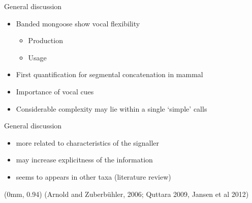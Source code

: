 \documentclass[xcolor=dvipsnames]{beamer}
\newcommand\References[1]{
\tiny{
  \begin{textblock*}{\paperwidth}(0mm, 0.94\paperheight)%
    \raggedleft (#1)\hspace{0.01\paperwidth}
  \end{textblock*}}}
\begin{document}
\begin{frame}{General discussion}
\begin{itemize}
\item<1-> Banded mongoose show vocal flexibility
\begin{itemize}
\item<1> Production 
\item<1> Usage
\end{itemize}  
\item<2-> First quantification for segmental concatenation in mammal 
\item<3-> Importance of vocal cues
\item<4-> Considerable complexity  may lie within a single `simple' calls
\end{itemize}  
      \begin{figure}[h]
      \end{figure}
\end{frame}
\begin{frame}{General discussion}
\begin{overlayarea}{\textwidth}{0.5\paperheight}
\vspace{.2cm}
\begin{itemize}
\item<3-> more related to characteristics of the signaller
\item<4-> may increase explicitness of the information 
\item<5-> seems to appears in other taxa (literature review) 
\end{itemize}  
\vspace{.2cm}
\end{overlayarea}
\References{Arnold and Zuberb\"uhler, 2006; Quttara 2009, Jansen et al 2012} 
\end{frame}
\end{document}
